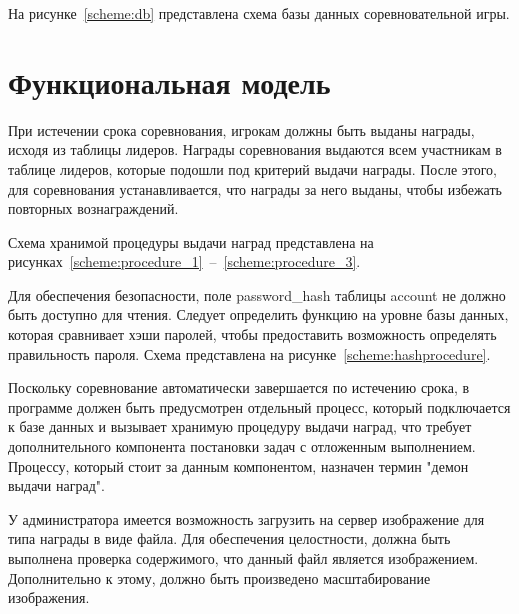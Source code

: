 \FloatBarrier

На рисунке~\ref{scheme:db} представлена схема базы данных соревновательной игры.


\section{Функциональная модель}
При истечении срока соревнования, игрокам должны быть выданы награды, исходя из таблицы лидеров. Награды соревнования выдаются всем участникам в таблице лидеров, которые подошли под критерий выдачи награды. После этого, для соревнования устанавливается, что награды за него выданы, чтобы избежать повторных вознаграждений.

Схема хранимой процедуры выдачи наград представлена на рисунках~\ref{scheme:procedure_1}~--~\ref{scheme:procedure_3}.

Для обеспечения безопасности, поле password\_hash таблицы account не должно быть доступно для чтения. Следует определить функцию на уровне базы данных, которая сравнивает хэши паролей, чтобы предоставить возможность определять правильность пароля. Схема представлена на рисунке~\ref{scheme:hashprocedure}.


Поскольку соревнование автоматически завершается по истечению срока, в программе должен быть предусмотрен отдельный процесс, который подключается к базе данных и вызывает хранимую процедуру выдачи наград, что требует дополнительного компонента постановки задач с отложенным выполнением. Процессу, который стоит за данным компонентом, назначен термин "демон выдачи наград".

У администратора имеется возможность загрузить на сервер изображение для типа награды в виде файла. Для обеспечения целостности, должна быть выполнена проверка содержимого, что данный файл является изображением. Дополнительно к этому, должно быть произведено масштабирование изображения.

